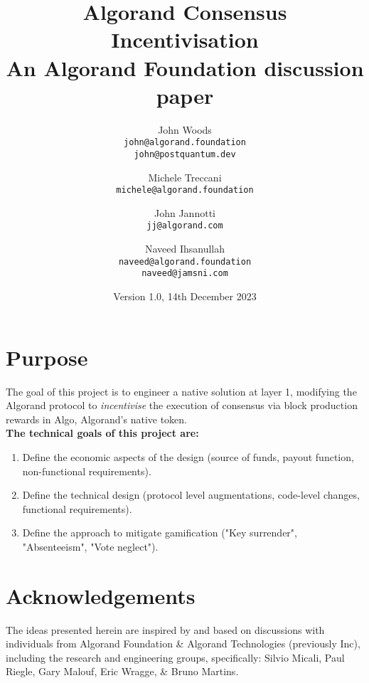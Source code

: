 \documentclass[11pt,a4paper]{article}
\begin{document}
\title {Algorand Consensus Incentivisation \\
       {\large \sc An Algorand Foundation discussion paper}}
\date  {Version 1.0, 14th December 2023}
\author{
    John Woods \\ 
    {\small \texttt{john@algorand.foundation}} \\
    {\small \texttt{john@postquantum.dev}} \\
\and 
    Michele Treccani \\
    {\small \texttt{michele@algorand.foundation}}
\and 
    John Jannotti \\
    {\small \texttt{jj@algorand.com}}
\and 
    Naveed Ihsanullah \\
    {\small \texttt{naveed@algorand.foundation}} \\
    {\small \texttt{naveed@jamsni.com}}
}

\maketitle

\section{Purpose}
The goal of this project is to engineer a native solution at layer 1, modifying the Algorand protocol to 
\emph{incentivise} the execution of consensus via block production rewards in Algo, Algorand's native token. \\

\textbf{The technical goals of this project are:}

\begin{enumerate}
    \item Define the economic aspects of the design (source of funds, payout function, non-functional requirements). 
        
    \item Define the technical design (protocol level augmentations, code-level changes, functional requirements). 
        
    \item Define the approach to mitigate gamification ("Key surrender", "Absenteeism", "Vote neglect").
\end{enumerate}

\pagebreak

\tableofcontents

\pagebreak

\section{Acknowledgements}
The ideas presented herein are inspired by and based on discussions with individuals from Algorand Foundation \& 
Algorand Technologies (previously Inc), including the research and engineering groups, specifically: Silvio Micali, 
Paul Riegle, Gary Malouf, Eric Wragge, \& Bruno Martins.
\end{document}
